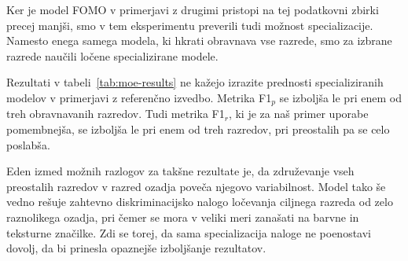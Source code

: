 \documentclass[a4paper,twoside,openright,12pt,slovene]{book}
\begin{document}

            Ker je model FOMO v primerjavi z drugimi pristopi na tej podatkovni
            zbirki precej manjši, smo v tem eksperimentu preverili tudi možnost
            specializacije. Namesto enega samega modela, ki hkrati obravnava
            vse razrede, smo za izbrane razrede naučili ločene specializirane
            modele.

            Rezultati v tabeli~\ref{tab:moe-results}
            ne
            kažejo izrazite prednosti specializiranih modelov v primerjavi z
            referenčno izvedbo. Metrika F1$_p$ se izboljša le pri enem od treh
            obravnavanih razredov. Tudi metrika F1$_r$, ki je za naš primer
            uporabe pomembnejša, se izboljša le pri enem od treh razredov, pri
            preostalih pa se celo poslabša.

            Eden izmed možnih razlogov za takšne rezultate je, da združevanje
            vseh preostalih razredov v razred ozadja poveča njegovo
            variabilnost. Model tako še vedno rešuje zahtevno diskriminacijsko
            nalogo ločevanja ciljnega razreda od zelo raznolikega ozadja, pri
            čemer se mora v veliki meri zanašati na barvne in teksturne
            značilke. Zdi se torej, da sama specializacija naloge ne poenostavi
            dovolj, da bi prinesla opaznejše izboljšanje rezultatov.
\end{document}
